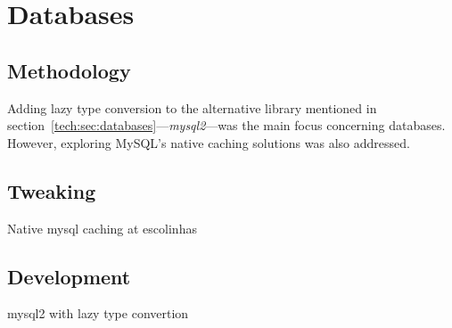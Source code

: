 \section{Databases} %
\label{solution:sec:databases}

\subsection{Methodology}
Adding lazy type conversion to the alternative library mentioned in section~\ref{tech:sec:databases}---\textit{mysql2}---was the main focus concerning databases. However, exploring MySQL's native caching solutions was also addressed.



\subsection{Tweaking}
Native mysql caching at escolinhas

\subsection{Development}
mysql2 with lazy type convertion
